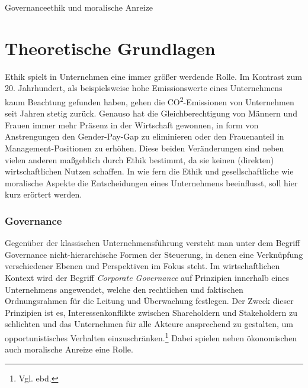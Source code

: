 \documentclass[12pt]{article}
\begin{document}
\renewcommand{\mytitle}{Governanceethik und\\moralische Anreize}%
\renewcommand{\myauthor}{Lennart Schulte-Kellinghaus,\\Timo Stovermann}%
\renewcommand{\headheight}{27pt}%

%
\begin{center}
\LARGE{Governanceethik und moralische Anreize}
\end{center}
\clearpage
\frontmatter%


\renewcommand{\plaintitle}{Inhaltsverzeichnis}%
{\def\makebox[#1][#2]#3{#3}%
	\tableofcontents
}


\clearpage
\mainmatter%

\part{Theoretische Grundlagen}
Ethik spielt in Unternehmen eine immer größer werdende Rolle. Im Kontrast zum 20. Jahrhundert, als beispielsweise hohe Emissionswerte eines Unternehmens kaum Beachtung gefunden haben, gehen die CO\textsuperscript{2}-Emissionen von Unternehmen seit Jahren stetig zurück. Genauso hat die Gleichberechtigung von Männern und Frauen immer mehr Präsenz in der Wirtschaft gewonnen, in form von Anstrengungen den Gender-Pay-Gap zu eliminieren oder den Frauenanteil in Management-Positionen zu erhöhen. Diese beiden Veränderungen sind neben vielen anderen maßgeblich durch Ethik bestimmt, da sie keinen (direkten) wirtschaftlichen Nutzen schaffen. In wie fern die Ethik und gesellschaftliche wie moralische Aspekte die Entscheidungen eines Unternehmens beeinflusst, soll hier kurz erörtert werden.

\section{Governance}
Gegenüber der klassischen Unternehmensführung versteht man unter dem Begriff Governance nicht-hierarchische Formen der Steuerung, in denen eine Verknüpfung verschiedener Ebenen und Perspektiven im Fokus steht. Im wirtschaftlichen Kontext wird der Begriff \textit{Corporate Governance} auf Prinzipien innerhalb eines Unternehmens angewendet, welche den rechtlichen und faktischen Ordnungsrahmen für die Leitung und Überwachung festlegen. Der Zweck dieser Prinzipien ist es, Interessenkonflikte zwischen Shareholdern und Stakeholdern zu schlichten und das Unternehmen für alle Akteure ansprechend zu gestalten, um opportunistisches Verhalten einzuschränken.\footnote{Vgl. ebd.} Dabei spielen neben ökonomischen auch moralische Anreize eine Rolle.
\end{document}
